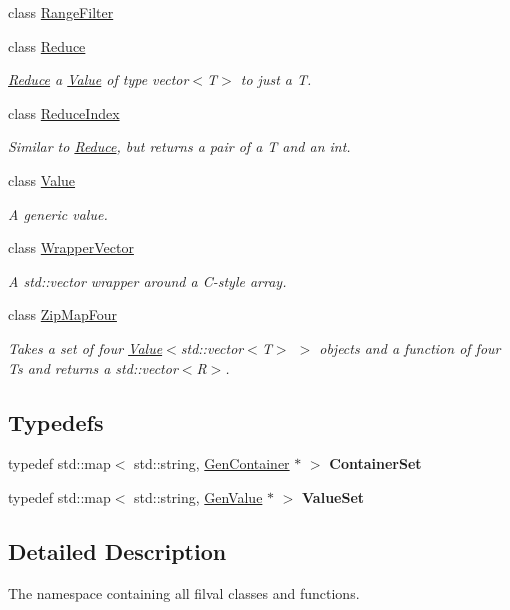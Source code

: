 \begin{DoxyCompactItemize}
class \hyperlink{classfilval_1_1RangeFilter}{Range\+Filter}
\item 
class \hyperlink{classfilval_1_1Reduce}{Reduce}
\begin{DoxyCompactList}\small\item\em \hyperlink{classfilval_1_1Reduce}{Reduce} a \hyperlink{classfilval_1_1Value}{Value} of type vector$<$\+T$>$ to just a T. \end{DoxyCompactList}\item 
class \hyperlink{classfilval_1_1ReduceIndex}{Reduce\+Index}
\begin{DoxyCompactList}\small\item\em Similar to \hyperlink{classfilval_1_1Reduce}{Reduce}, but returns a pair of a T and an int. \end{DoxyCompactList}\item 
class \hyperlink{classfilval_1_1Value}{Value}
\begin{DoxyCompactList}\small\item\em A generic value. \end{DoxyCompactList}\item 
class \hyperlink{classfilval_1_1WrapperVector}{Wrapper\+Vector}
\begin{DoxyCompactList}\small\item\em A std\+::vector wrapper around a C-\/style array. \end{DoxyCompactList}\item 
class \hyperlink{classfilval_1_1ZipMapFour}{Zip\+Map\+Four}
\begin{DoxyCompactList}\small\item\em Takes a set of four \hyperlink{classfilval_1_1Value}{Value}$<$std\+::vector$<$\+T$>$ $>$ objects and a function of four Ts and returns a std\+::vector$<$\+R$>$. \end{DoxyCompactList}\end{DoxyCompactItemize}
\subsection*{Typedefs}
\begin{DoxyCompactItemize}
\item 
\hypertarget{namespacefilval_ad5f7e77b42c6a776970b20e5e52be328}{}\label{namespacefilval_ad5f7e77b42c6a776970b20e5e52be328} 
typedef std\+::map$<$ std\+::string, \hyperlink{classfilval_1_1GenContainer}{Gen\+Container} $\ast$ $>$ {\bfseries Container\+Set}
\item 
\hypertarget{namespacefilval_a070dfc70821cfeab3039b7eace2dc122}{}\label{namespacefilval_a070dfc70821cfeab3039b7eace2dc122} 
typedef std\+::map$<$ std\+::string, \hyperlink{classfilval_1_1GenValue}{Gen\+Value} $\ast$ $>$ {\bfseries Value\+Set}
\end{DoxyCompactItemize}


\subsection{Detailed Description}
The namespace containing all filval classes and functions. 